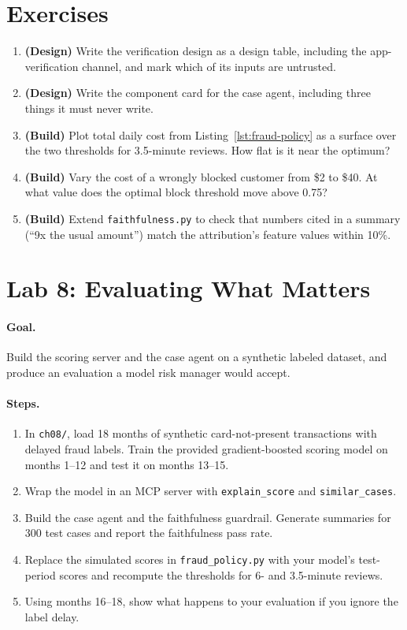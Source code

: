\section*{Exercises}

\begin{enumerate}[itemsep=2pt]
  \item \textbf{(Design)} Write the verification design as a design table, including the app-verification channel, and mark which of its inputs are untrusted.
  \item \textbf{(Design)} Write the component card for the case agent, including three things it must never write.
  \item \textbf{(Build)} Plot total daily cost from Listing~\ref{lst:fraud-policy} as a surface over the two thresholds for 3.5-minute reviews. How flat is it near the optimum?
  \item \textbf{(Build)} Vary the cost of a wrongly blocked customer from \$2 to \$40. At what value does the optimal block threshold move above 0.75?
  \item \textbf{(Build)} Extend \texttt{faithfulness.py} to check that numbers cited in a summary (``9x the usual amount'') match the attribution's feature values within 10\%.
\end{enumerate}

\section*{Lab 8: Evaluating What Matters}

\paragraph{Goal.} Build the scoring server and the case agent on a synthetic labeled dataset, and produce an evaluation a model risk manager would accept.

\paragraph{Steps.}
\begin{enumerate}[itemsep=2pt]
  \item In \texttt{ch08/}, load 18 months of synthetic card-not-present transactions with delayed fraud labels. Train the provided gradient-boosted scoring model on months 1--12 and test it on months 13--15.
  \item Wrap the model in an MCP server with \texttt{explain\_score} and \texttt{similar\_cases}.
  \item Build the case agent and the faithfulness guardrail. Generate summaries for 300 test cases and report the faithfulness pass rate.
  \item Replace the simulated scores in \texttt{fraud\_policy.py} with your model's test-period scores and recompute the thresholds for 6- and 3.5-minute reviews.
  \item Using months 16--18, show what happens to your evaluation if you ignore the label delay.
\end{enumerate}

